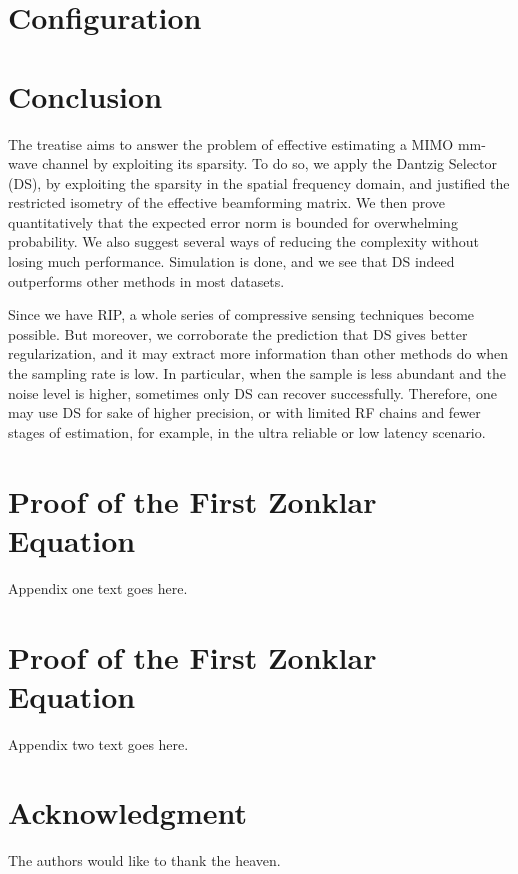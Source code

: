 \documentclass[journal]{IEEEtran}
\begin{document}
\section{Configuration}


\section{Conclusion}

The treatise aims to answer the problem of effective estimating a MIMO mm-wave channel by exploiting its sparsity.
To do so, we apply the Dantzig Selector (DS), by exploiting the sparsity in the spatial frequency domain, and justified the restricted isometry of the effective beamforming matrix.
We then prove quantitatively that the expected error norm is bounded for overwhelming probability.
We also suggest several ways of reducing the complexity without losing much performance.
Simulation is done, and we see that DS indeed outperforms other methods in most datasets.

Since we have RIP, a whole series of compressive sensing techniques become possible.
But moreover, we corroborate the prediction that DS gives better regularization, and it may extract more information than other methods do when the sampling rate is low.
In particular, when the sample is less abundant and the noise level is higher, sometimes only DS can recover successfully.
Therefore, one may use DS for sake of higher precision, or with limited RF chains and fewer stages of estimation, for example, in the ultra reliable or low latency scenario.


\appendices
\section{Proof of the First Zonklar Equation}
Appendix one text goes here.

\section{Proof of the First Zonklar Equation}
Appendix two text goes here.


\section*{Acknowledgment}

The authors would like to thank the heaven.
\end{document}
